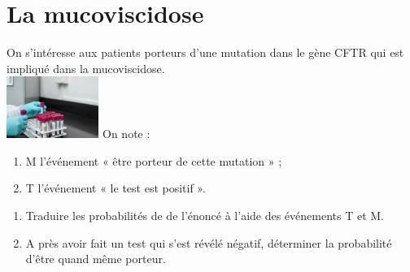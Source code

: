 \documentclass[a4paper,11pt,exos]{nsi} %
\begin{document}
\section*{La mucoviscidose}
\textcolor{UGLiBlue}{On s'intéresse aux patients porteurs d'une mutation dans le gène CFTR qui est impliqué dans la mucoviscidose.\\[.5em]
{\includegraphics[width=3cm]{lab-3498584_640.jpg}}
On note :
\begin{enumerate}[label=\textbullet]
    \item M l'événement « être porteur de cette mutation » ;
    \item T l'événement « le test est positif ».
\end{enumerate}
\begin{enumerate}
    \item Traduire les probabilités de de l'énoncé à l'aide des événements T et M.
    \item A près avoir fait un test qui s'est révélé négatif, déterminer la probabilité d'être quand même porteur.
\end{enumerate}}
\end{document}
